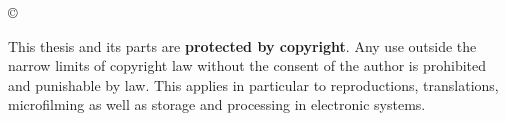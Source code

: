 \begin{titlepage}
    \begin{center}
        \copyright\ \jahr\\[1.0ex]
    \end{center}

    \singlespacing
    \small
    \noindent This thesis and its parts are \textbf{protected by copyright}. Any use outside the narrow limits of copyright law without the consent of the author is prohibited and punishable by law. This applies in particular to reproductions, translations, microfilming as well as storage and processing in electronic systems.



\end{titlepage}
